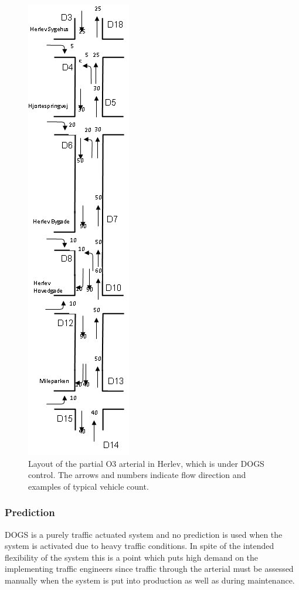 \begin{figure}[!ht]
\begin{center}
\includegraphics[scale=0.5,angle=90]{dogs_herlev.png} 
\end{center}
\caption{Layout of the partial O3 arterial in Herlev, which is under DOGS control. The arrows and numbers indicate flow direction and examples of typical vehicle count.}
\label{fig:dogs_herlev}
\end{figure}

\subsubsection*{Prediction}

DOGS is a purely traffic actuated system and no prediction is used
when the system is activated due to heavy traffic conditions.
In spite of the intended flexibility of the system this is a point
which puts high demand on the implementing traffic engineers since
traffic through the arterial must be assessed manually when the system
is put into production as well as during maintenance.

